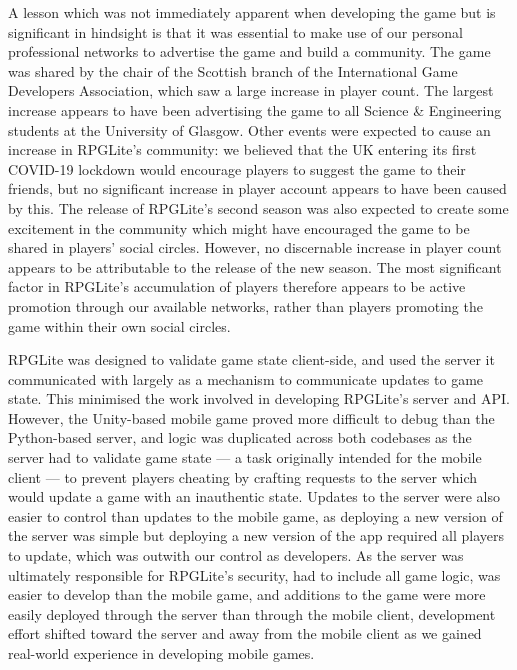 A lesson which was not immediately apparent when developing the game but is
significant in hindsight  is that it was essential to make
use of our personal professional networks to advertise the game and build a
community. The game was shared by the chair of the Scottish branch of the
International Game Developers Association, which saw a large increase in player
count. The largest increase appears to have been advertising the game to all
Science \& Engineering students at the University of Glasgow. Other events were
expected to cause an increase in RPGLite's community: we believed that the UK
entering its first COVID-19 lockdown would encourage players to suggest the game
to their friends, but no significant increase in player account appears to have
been caused by this. The release of RPGLite's second season was also expected to
create some excitement in the community which might have encouraged the game to
be shared in players' social circles. However, no discernable increase in player
count appears to be attributable to the release of the new season. The most
significant factor in RPGLite's accumulation of players therefore appears to be
active promotion through our available networks, rather than players promoting
the game within their own social circles.

RPGLite was designed to validate game state client-side, and used the server it
communicated with largely as a mechanism to communicate updates to game state.
This minimised the work involved in developing RPGLite's server and API.
However, the Unity-based mobile game proved more difficult to debug than the
Python-based server, and logic was duplicated across both codebases as the
server had to validate game state --- a task originally intended for the mobile
client --- to prevent players cheating by crafting requests to the server which
would update a game with an inauthentic state. Updates to the server were also
easier to control than updates to the mobile game, as deploying a new version of
the server was simple but deploying a new version of the app required all
players to update, which was outwith our control as developers. As the server
was ultimately responsible for RPGLite's security, had to include all game
logic, was easier to develop than the mobile game, and additions to the game
were more easily deployed through the server than through the mobile client,
development effort shifted toward the server and away from the mobile client as
we gained real-world experience in developing mobile games. 



